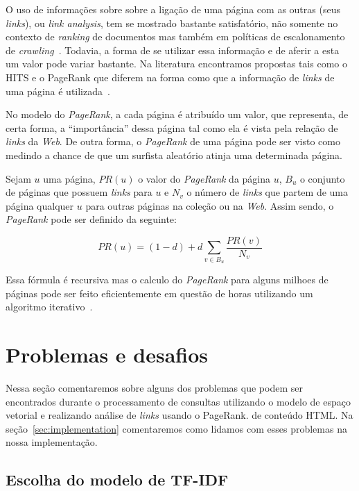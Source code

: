 \documentclass[10pt,twocolumn]{article}
\begin{document}
O uso de informações sobre sobre a ligação de uma página com as outras
(seus \emph{links}), ou \emph{link analysis}, tem se mostrado bastante
satisfatório, não somente no contexto de \emph{ranking} de documentos
mas também em políticas de escalonamento de
\emph{crawling}~\cite{baezayates2005crawling}. Todavia, a forma de se
utilizar essa informação e de aferir a esta um valor pode variar
bastante. Na literatura encontramos propostas tais como o HITS e o
PageRank que diferem na forma como que a informação de \emph{links} de
uma página é utilizada~\cite{page98pagerank}.

No modelo do \emph{PageRank}, a cada página é atribuído um valor, que
representa, de certa forma, a ``importância'' dessa página tal como ela
é vista pela relação de \emph{links} da \emph{Web}. De outra forma, o
\emph{PageRank} de uma página pode ser visto como medindo a chance de
que um surfista aleatório atinja uma determinada página.

Sejam \(u\) uma página, \(PR(u)\) o valor do \emph{PageRank} da página
\(u\), \(B_u\) o conjunto de páginas que possuem
\emph{links} para \(u\) e \(N_v\) o número de \emph{links} que
partem de uma página qualquer \(u\) para outras páginas na coleção ou na
\emph{Web}. Assim sendo, o \emph{PageRank} pode ser definido da
seguinte:

\begin{equation}
 PR(u) = (1-d) + d\sum_{v \in B_u}\frac{PR(v)}{N_v}
\label{eq:pagerank}
\end{equation}

Essa fórmula é recursiva mas o calculo do \emph{PageRank} para alguns
milhoes de páginas pode ser feito eficientemente em questão de horas
utilizando um algoritmo iterativo~\cite{brin1998google}.




\section{Problemas e desafios}

Nessa seção comentaremos sobre alguns dos problemas que podem ser
encontrados durante o processamento de consultas utilizando o modelo de
espaço vetorial e realizando análise de \emph{links} usando o PageRank.
de conteúdo HTML. Na
seção~\ref{sec:implementation} comentaremos como lidamos com esses
problemas na nossa implementação.

\subsection{Escolha do modelo de TF-IDF}
\end{document}
